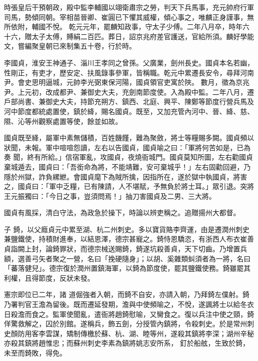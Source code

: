 \begin{pinyinscope}
 時張皇后干預朝政，殿中監李輔國以翊衛肅宗之勞，判天下兵馬事，充元帥府行軍司馬，勢傾同朝。宰相苗晉卿、崔圓已下懼其威權，傾心事之，唯麟正身謹事，無所依附，輔國不悅。
 乾元元年，罷麟知政事，守太子少傅。二年八月卒，時年六十六，贈太子太傅，賻絹二百匹。葬日，詔京兆府差官護送，官給所須。麟好學能文，嘗編聚皇朝已來制集五十卷，行於時。



 李國貞，淮安王神通子、淄川王孝同之曾孫。父廣業，劍州長史。國貞本名若幽，性剛正，有吏才，歷安定、扶風錄事參軍，皆稱職。乾元中累遷長安令，尋拜河南尹。會史思明逼城，元帥李光弼東保河陽，國貞領官吏寓於陜。
 數月，徵為京兆尹。上元初，改成都尹、兼御史大夫，充劍南節度使。入為殿中監。二年八月，遷戶部尚書、兼御史大夫，持節充朔方、鎮西、北庭、興平、陳鄭等節度行營兵馬及河中節度都統處置使，鎮於絳，賜名國貞。既至，又加充管內河中、晉、絳、慈、隰、沁等州觀察處置等使，餘並如故。



 國貞既至絳，屬軍中素無儲積，百姓饑饉，難為聚斂，將士等糧賜多闕。國貞頻以狀聞，未報。軍中喧喧怨讀，左右以告國貞，國貞喻之曰：「軍將何苦如是，已為奏
 聞，終有所給。」信宿軍亂，攻國貞，夜燒衙城門。國貞莫知所圖，左右勸國貞棄城遁去，國貞曰：「吾銜命為將，不能靖難，安可棄城乎！」左右固勸回避，乃隱於州獄，詐負縲紲。會國貞麾下為賊所擒，因指所在，遂於獄中執國貞，將害之，國貞曰：「軍中乏糧，已有陳請，人不堪賦，予無負於將士耳。」眾引退。突將王元振獨曰：「今日之事，豈須問焉！」抽刀害國貞及二男、三大將。



 國貞有風採，清白守法，為政急於操下，時論以辨吏稱之。追贈揚州大都督。



 子
 錡，以父廕貞元中累至湖、杭二州刺史。多以寶貨賂李齊運，由是遷潤州刺史兼鹽鐵使，持積財進奉，以結恩澤，德宗甚寵之。錡恃恩驕恣，有浙西人布衣崔善貞詣闕上封，論錡罪狀，而德宗械送賜錡，錡遂坑殺善貞，天下切齒。乃增置兵額，選善弓矢者聚之一營，名曰「挽硬隨身」；以胡、奚雜類虯須者為一將，名曰「蕃落健兒」。德宗復於潤州置鎮海軍，以錡為節度使，罷其鹽鐵使務。錡雖罷其利權，且得節度，反狀未發。



 憲宗即位已二年，諸
 道倔強者入朝，而錡不自安，亦請入朝，乃拜錡左僕射。錡乃署判官王澹為留後。既而遷延發期，澹與中使頻喻之，不悅，遂諷將士以給冬衣日殺澹而食之。監軍使聞亂，遣衙將趙錡慰喻，又臠食之。復以兵注中使之頸，錡佯驚救解之，囚於別館。遂稱兵，飾五劍，分授管內鎮將，令殺刺史。於是常州刺史顏防用客李雲謀，矯制傳檄於蘇、杭、湖、睦等州，遂殺其鎮將李深；湖州辛秘亦殺其鎮將趙惟忠；而蘇州刺史李素為鎮將姚志安所系，
 釘於船舷，生致於錡，未至而錡敗，得免。




\end{pinyinscope}
